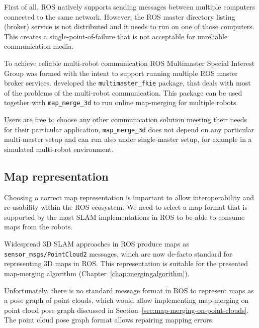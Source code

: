 First of all, \gls{ROS} natively supports sending messages between multiple computers connected to the same network. However, the \gls{ROS} master directory listing (broker) service is not distributed and it needs to run on one of those computers. This creates a single-point-of-failure that is not acceptable for unreliable communication media.

To achieve reliable multi-robot communication \gls{ROS} Multimaster Special Interest Group was formed with the intent to support running multiple \gls{ROS} master broker services. \citet{hernadez2015multi} developed the \texttt{multimaster\_fkie} package, that deals with most of the problems of the multi-robot communication. This package can be used together with \texttt{map\_merge\_3d} to run online map-merging for multiple robots.

Users are free to choose any other communication solution meeting their needs for their particular application, \texttt{map\_merge\_3d} does not depend on any particular multi-master setup and can run also under single-master setup, for example in a simulated multi-robot environment.

\subsection{Map representation}
\label{sec:map-representation}

Choosing a correct map representation is important to allow interoperability and re-usability within the \gls{ROS} ecosystem. We need to select a map format that is supported by the most \gls{SLAM} implementations in \gls{ROS} to be able to consume maps from the robots.

Widespread \gls{3D} \gls{SLAM} approaches in \gls{ROS} produce maps as \texttt{sen\-sor\_msgs/\-Point\-Cloud2} messages, which are now de-facto standard for representing \gls{3D} maps in \gls{ROS}. This representation is suitable for the presented map-merging algorithm (Chapter~\ref{chap:mergingalgorithm}).

Unfortunately, there is no standard message format in \gls{ROS} to represent maps as a pose graph of point clouds, which would allow implementing map-merging on point cloud pose graph discussed in Section~\ref{sec:map-merging-on-point-clouds}. The point cloud pose graph format allows repairing mapping errors.

